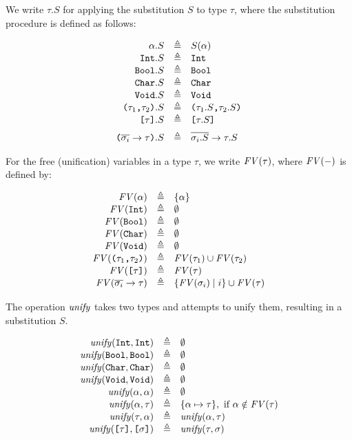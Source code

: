 We write $\tau.S$ for applying the substitution $S$ to type $\tau$, where the
substitution procedure is defined as follows:

\[
\begin{array}{rcl}
  \alpha.S & \eqdef & S(\alpha) \\
  \Int.S & \eqdef & \Int \\
  \Bool.S & \eqdef & \Bool \\
  \Char.S & \eqdef & \Char \\
  \Void.S & \eqdef & \Void \\
  \TProd{\tau_1}{\tau_2}.S & \eqdef & \TProd{\tau_1.S}{\tau_2.S} \\
  \TList{\tau}.S & \eqdef & \TList{\tau.S} \br
  \Parens{ \TFun{\set{\sigma_i}}{\tau} }.S & \eqdef & \TFun{\set{\sigma_i.S}}{\tau.S}
\end{array}
\]

For the free (unification) variables in a type $\tau$, we write $\mathit{FV}(\tau)$, where
$\mathit{FV}(-)$ is defined by:

\[
\begin{array}{rcl}
  \mathit{FV}(\alpha) & \triangleq & \{ \alpha \} \\
  \mathit{FV}(\texttt{Int}) & \triangleq & \emptyset \\
  \mathit{FV}(\texttt{Bool}) & \triangleq & \emptyset \\
  \mathit{FV}(\texttt{Char}) & \triangleq & \emptyset \\
  \mathit{FV}(\texttt{Void}) & \triangleq & \emptyset \\
  \mathit{FV}( \texttt{(}\tau_1\texttt{,}\tau_2\texttt{)} ) & \triangleq & \mathit{FV}(\tau_1) \cup \mathit{FV}(\tau_2) \\
  \mathit{FV}( \texttt{[}\tau\texttt{]} ) & \triangleq & \mathit{FV}(\tau) \\
  \mathit{FV}( \overline{\sigma_i} \to \tau ) & \triangleq & \{ \mathit{FV}(\sigma_i) \mid i \} \cup \mathit{FV}(\tau)
\end{array}
\]

The operation $\mathit{unify}$ takes two types and attempts to unify them, resulting in
a substitution $S$.

\[
\begin{array}{rcl}
  \mathit{unify}(\texttt{Int},\texttt{Int}) & \triangleq & \emptyset \\
  \mathit{unify}(\texttt{Bool},\texttt{Bool}) & \triangleq & \emptyset \\
  \mathit{unify}(\texttt{Char},\texttt{Char}) & \triangleq & \emptyset \\
  \mathit{unify}(\texttt{Void},\texttt{Void}) & \triangleq & \emptyset \\
  \mathit{unify}(\alpha,\alpha) & \triangleq & \emptyset \\
  \mathit{unify}(\alpha,\tau) & \triangleq &
    \{ \alpha \mapsto \tau \},\ \text{if}\ \alpha \notin \mathit{FV}(\tau) \\
  \mathit{unify}(\tau,\alpha) & \triangleq & \mathit{unify}(\alpha,\tau) \\
  \mathit{unify}(\texttt{[}\tau\texttt{]},\texttt{[}\sigma\texttt{]}) & \triangleq & \mathit{unify}(\tau,\sigma)
\end{array}
\]

